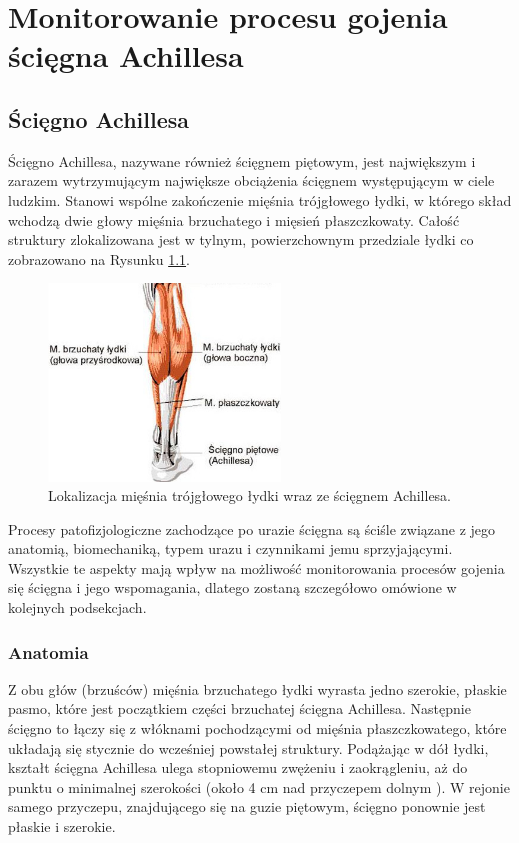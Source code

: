 \chapter{Monitorowanie procesu gojenia ścięgna Achillesa}
\section{Ścięgno Achillesa}
Ścięgno Achillesa, nazywane również ścięgnem piętowym, jest największym i zarazem wytrzymującym największe obciążenia ścięgnem występującym w ciele ludzkim. Stanowi wspólne zakończenie mięśnia trójgłowego łydki, w którego skład wchodzą dwie głowy mięśnia brzuchatego i mięsień płaszczkowaty. Całość struktury zlokalizowana jest w tylnym, powierzchownym przedziale łydki co zobrazowano na Rysunku \ref{muscle_structure}.  
\begin{figure}[h!]
\centering
\includegraphics[width=0.55\textwidth]{figures/muscleStructure.jpg}
\caption{Lokalizacja mięśnia trójgłowego łydki wraz ze ścięgnem Achillesa.}
\label{muscle_structure}
\end{figure}

Procesy patofizjologiczne zachodzące po urazie ścięgna są ściśle związane z jego anatomią, biomechaniką, typem urazu i czynnikami jemu sprzyjającymi. Wszystkie te aspekty mają wpływ na możliwość monitorowania procesów gojenia się ścięgna i jego wspomagania, dlatego zostaną szczegółowo omówione w kolejnych podsekcjach. 

\subsection{Anatomia}

Z obu głów (brzuśców) mięśnia brzuchatego łydki wyrasta jedno szerokie, płaskie pasmo, które jest początkiem części brzuchatej ścięgna Achillesa. Następnie ścięgno to łączy się z włóknami pochodzącymi od mięśnia płaszczkowatego, które układają się stycznie do wcześniej powstałej struktury. Podążając w dół łydki, kształt ścięgna Achillesa ulega stopniowemu zwężeniu i zaokrągleniu, aż do punktu o minimalnej szerokości (około 4 cm nad przyczepem dolnym \cite{Doral2010}). W rejonie samego przyczepu, znajdującego się na guzie piętowym, ścięgno ponownie jest płaskie i szerokie.

